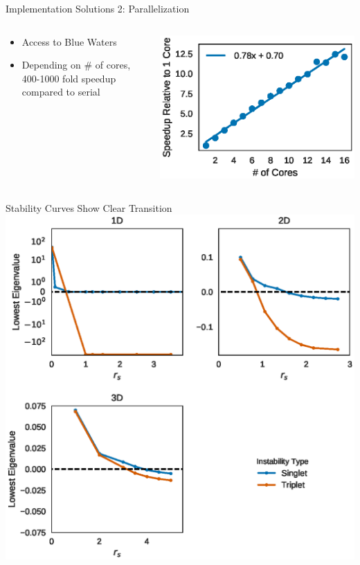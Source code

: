 \documentclass[10pt]{beamer}
\begin{document}
{{{{{{{{{{\begin{frame}{Implementation Solutions 2: Parallelization}
	\begin{columns}[c] %
		\begin{column}{.4\textwidth}
			\begin{itemize}
			  \item {Access to Blue Waters}
			  \item {Depending on \# of cores, 400-1000 fold speedup compared to serial}
			\end{itemize}
		\end{column}
		\begin{column}{0.7\textwidth}
		    \vspace{5mm}
		    \begin{overprint}
		    \centering
			    \includegraphics[width=0.9\linewidth]{../figures/parallel-scaling.eps}
			\end{overprint}
		\end{column}
	\end{columns}
\end{frame}


{%
\begin{frame}{Stability Curves Show Clear Transition}
  \centering
	\includegraphics[width=0.75\linewidth]{../figures/stability.eps}
\end{frame}

}}}}}}}}}}}
\end{document}

